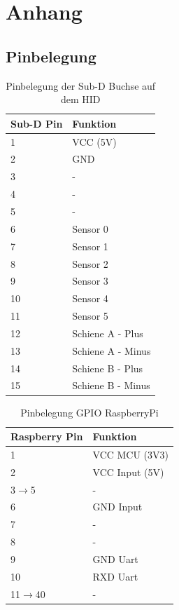 \documentclass[a4paper, 11pt]{report}
\begin{document}


\chapter{Anhang}
\section{Pinbelegung}

\begin{table}
		\begin{tabular}{|l|l|}
			\hline
			\textbf{Sub-D Pin} &\textbf{Funktion}\\
			\hline
			\hline
			1 & VCC (5V)\\
			\hline
			2 & GND\\
			\hline
			3 & -\\
			\hline
			4 & -\\
			\hline
			5 & -\\
			\hline
			6 & Sensor 0\\
			\hline
			7 & Sensor 1\\
			\hline
			8 & Sensor 2\\
			\hline
			9 & Sensor 3\\
			\hline
			10 & Sensor 4\\
			\hline
			11 & Sensor 5\\
			\hline
			12 & Schiene A - Plus\\
			\hline
			13 & Schiene A - Minus\\
			\hline
			14 & Schiene B - Plus\\
			\hline
			15 & Schiene B - Minus\\
			\hline
		\end{tabular}
		\caption{Pinbelegung der Sub-D Buchse auf dem HID}
		\label{tab:AnhangBelegungSUBD}
	\end{table}

	\begin{table}
		\begin{tabular}{|l|l|}
			\hline
			\textbf{Raspberry Pin} &\textbf{Funktion}\\
			\hline
			\hline
			1 & VCC MCU (3V3)\\
			\hline
			2 & VCC Input (5V)\\
			\hline
			3$\rightarrow$5 & -\\
			\hline
			6 & GND Input\\
			\hline
			7 & -\\
			\hline
			8 & -\\
			\hline
			9 & GND Uart\\
			\hline
			10 & RXD Uart\\
			\hline
			11$\rightarrow$40 & -\\
			\hline
		\end{tabular}
		\caption{Pinbelegung GPIO RaspberryPi}
		\label{tab:AnhangBelegungRPI}
	\end{table}
\end{document}
